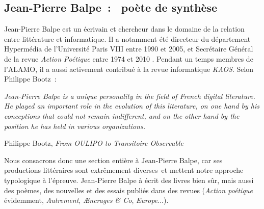 \documentclass{article}
\newenvironment{citationbox}
{\begin{center}
		\begin{minipage}{.8\textwidth}
		}
		{
		\end{minipage}	
\end{center}
}
\begin{document}
		\subsection{Jean-Pierre Balpe~: \guillemotleft~poète de synthèse~\guillemotright}\label{balpe}
			Jean-Pierre Balpe est un écrivain et chercheur dans le domaine de la relation entre littérature et informatique. Il a notamment été directeur du département Hypermédia de l'Université Paris VIII entre 1990 et 2005, et Secrétaire Général de la revue \textit{Action Poétique} entre 1974 et 2010 \autocite{wiki:jp_balpe}. Pendant un temps membres de l'ALAMO, il a aussi activement contribué à la revue informatique \textit{KAOS}. Selon Philippe Bootz~:
			\begin{citationbox}
				\textit{Jean-Pierre Balpe is a unique personality in the field of French digital literature. He played an important role in the evolution of this literature, on one hand by his conceptions that could not remain indifferent, and on the other hand by the position he has held in various organizations.}
				\begin{flushright}
					Philippe Bootz, \textit{From OULIPO to Transitoire Observable} \autocite{bootz2012}
				\end{flushright}
			\end{citationbox}
			Nous consacrons donc une section entière à Jean-Pierre Balpe, car ses productions littéraires sont extrêmement diverses et mettent notre approche typologique à l'épreuve. Jean-Pierre Balpe à écrit des livres bien sûr, mais aussi des poèmes, des nouvelles et des essais publiés dans des revues (\textit{Action poétique} évidemment, \textit{Autrement}, \textit{Æncrages \& Co}, \textit{Europe}...).\\
			
\end{document}
